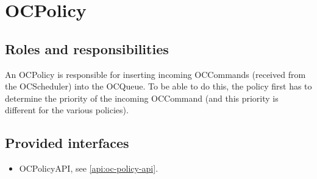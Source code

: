 \section{OCPolicy}
\label{element:oc-policy}

\subsection{Roles and responsibilities}

\npar An OCPolicy is responsible for inserting incoming OCCommands (received
from the OCScheduler) into the OCQueue. To be able to do this, the policy first
has to determine the priority of the incoming OCCommand (and this priority is
different for the various policies).

\subsection{Provided interfaces}

\begin{itemize}
  \item OCPolicyAPI, see \ref{api:oc-policy-api}.
\end{itemize}